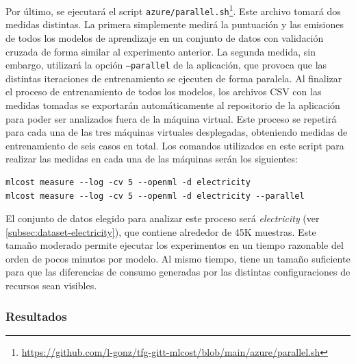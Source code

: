 


Por último, se ejecutará el script \texttt{azure/parallel.sh}\footnote{\url{https://github.com/l-gonz/tfg-gitt-mlcost/blob/main/azure/parallel.sh}}. Este archivo tomará dos medidas distintas. La primera simplemente medirá la puntuación y las emisiones de todos los modelos de aprendizaje en un conjunto de datos con validación cruzada de forma similar al experimento anterior. La segunda medida, sin embargo, utilizará la opción \texttt{--parallel} de la aplicación, que provoca que las distintas iteraciones de entrenamiento se ejecuten de forma paralela. Al finalizar el proceso de entrenamiento de todos los modelos, los archivos CSV con las medidas tomadas se exportarán automáticamente al repositorio de la aplicación para poder ser analizados fuera de la máquina virtual. Este proceso se repetirá para cada una de las tres máquinas virtuales desplegadas, obteniendo medidas de entrenamiento de seis casos en total. Los comandos utilizados en este script para realizar las medidas en cada una de las máquinas serán los siguientes:
\begin{verbatim}
mlcost measure --log -cv 5 --openml -d electricity
mlcost measure --log -cv 5 --openml -d electricity --parallel
\end{verbatim}

El conjunto de datos elegido para analizar este proceso será \emph{electricity} (ver \ref{subsec:dataset-electricity}), que contiene alrededor de 45K muestras. Este tamaño moderado permite ejecutar los experimentos en un tiempo razonable del orden de pocos minutos por modelo. Al mismo tiempo, tiene un tamaño suficiente para que las diferencias de consumo generadas por las distintas configuraciones de recursos sean visibles. 


\subsubsection{Resultados}

